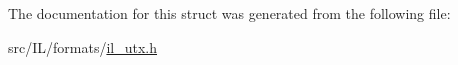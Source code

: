 The documentation for this struct was generated from the following file\-:\begin{DoxyCompactItemize}
\item 
src/\-I\-L/formats/\hyperlink{il__utx_8h}{il\-\_\-utx.\-h}\end{DoxyCompactItemize}

